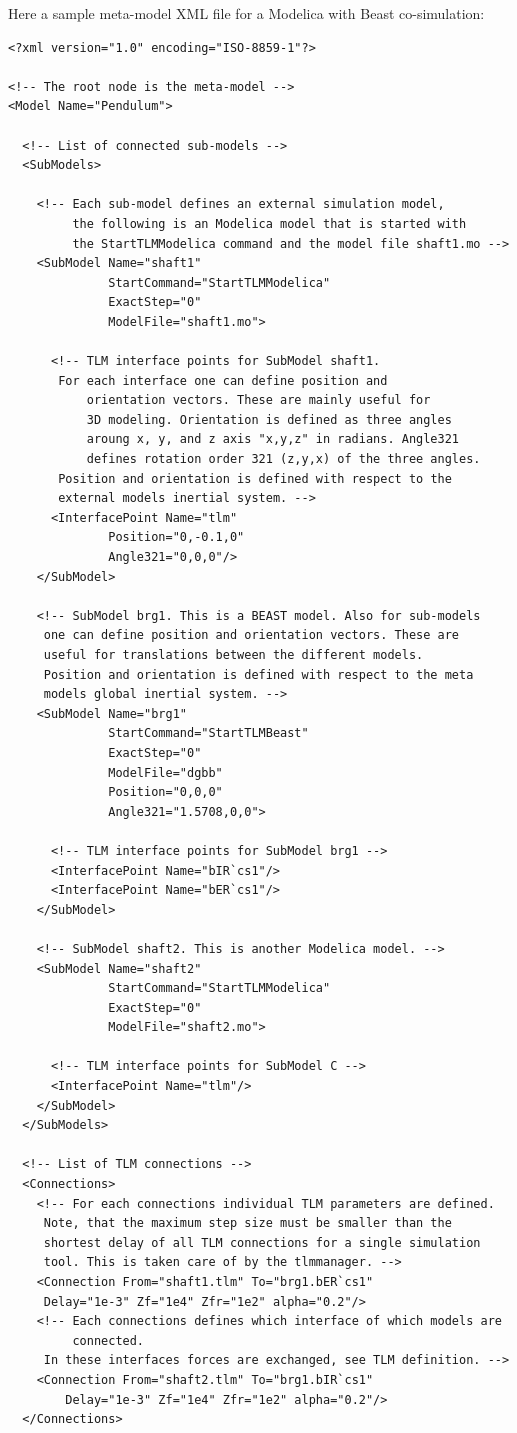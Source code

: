 Here a sample meta-model XML file for a Modelica with Beast co-simulation:
{\scriptsize
\begin{verbatim}
<?xml version="1.0" encoding="ISO-8859-1"?>

<!-- The root node is the meta-model -->
<Model Name="Pendulum">

  <!-- List of connected sub-models -->
  <SubModels>	
    
    <!-- Each sub-model defines an external simulation model, 
         the following is an Modelica model that is started with
         the StartTLMModelica command and the model file shaft1.mo -->
    <SubModel Name="shaft1"
              StartCommand="StartTLMModelica" 
              ExactStep="0"
              ModelFile="shaft1.mo">
      
      <!-- TLM interface points for SubModel shaft1. 
	   For each interface one can define position and 
           orientation vectors. These are mainly useful for
           3D modeling. Orientation is defined as three angles
           aroung x, y, and z axis "x,y,z" in radians. Angle321
           defines rotation order 321 (z,y,x) of the three angles. 
	   Position and orientation is defined with respect to the 
	   external models inertial system. -->
      <InterfacePoint Name="tlm"
		      Position="0,-0.1,0"
		      Angle321="0,0,0"/>
    </SubModel>
    
    <!-- SubModel brg1. This is a BEAST model. Also for sub-models
	 one can define position and orientation vectors. These are
	 useful for translations between the different models.
	 Position and orientation is defined with respect to the meta
	 models global inertial system. -->
    <SubModel Name="brg1" 
              StartCommand="StartTLMBeast" 
              ExactStep="0"
              ModelFile="dgbb"
              Position="0,0,0"
              Angle321="1.5708,0,0">
      
      <!-- TLM interface points for SubModel brg1 -->
      <InterfacePoint Name="bIR`cs1"/>
      <InterfacePoint Name="bER`cs1"/>
    </SubModel>
    
    <!-- SubModel shaft2. This is another Modelica model. -->
    <SubModel Name="shaft2" 
              StartCommand="StartTLMModelica" 
              ExactStep="0"
              ModelFile="shaft2.mo">
      
      <!-- TLM interface points for SubModel C -->
      <InterfacePoint Name="tlm"/>
    </SubModel>    
  </SubModels>

  <!-- List of TLM connections -->
  <Connections>
    <!-- For each connections individual TLM parameters are defined.
	 Note, that the maximum step size must be smaller than the
	 shortest delay of all TLM connections for a single simulation
	 tool. This is taken care of by the tlmmanager. --> 
    <Connection From="shaft1.tlm" To="brg1.bER`cs1"
	 Delay="1e-3" Zf="1e4" Zfr="1e2" alpha="0.2"/>
    <!-- Each connections defines which interface of which models are 
         connected.
	 In these interfaces forces are exchanged, see TLM definition. -->
    <Connection From="shaft2.tlm" To="brg1.bIR`cs1" 
		Delay="1e-3" Zf="1e4" Zfr="1e2" alpha="0.2"/>
  </Connections>
  

\end{verbatim}}
